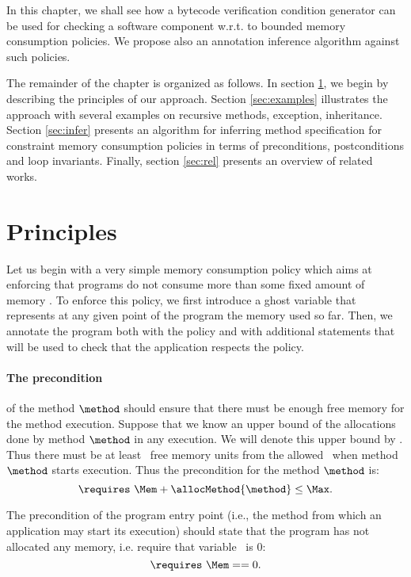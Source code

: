
In this chapter, we shall see how a bytecode verification condition generator can be used 
for checking a software component w.r.t. to bounded memory consumption policies.
We  propose also an annotation inference algorithm against such policies.

The remainder of the chapter is organized as follows. 
In section \ref{sec:principles},  we begin by describing the principles of our
approach. Section \ref{sec:examples} illustrates the approach with several examples on recursive methods, exception, inheritance.
Section \ref{sec:infer} presents an algorithm for inferring method specification for constraint memory consumption policies 
in terms of preconditions, postconditions and loop invariants. 
Finally, section \ref{sec:rel} presents an overview of related works.

\section{Principles} \label{sec:principles}
Let us begin with a very simple memory consumption policy which aims
at enforcing that  programs do not consume more than
some fixed amount of memory \Max . To enforce this policy, we first
introduce a ghost variable \Mem{} that represents at any given point of
the program the memory used so far. Then, we annotate the program both
with the policy and with additional statements that will be used to
check that the application respects the policy.



\paragraph{The precondition} of the method $\method$ should ensure that
there must be enough free memory for the method execution. Suppose
that we know an upper bound of the allocations done by method $\method$
in any execution. We will denote this upper bound by
\allocMethod{\method}. Thus there must be at least
\allocMethod{\method}\ free memory units from the allowed \Max\ when
method $\method$ starts execution. Thus the precondition for the method
$\method$ is:
$$
\requires \ \Mem + \allocMethod{\method}  \leq \Max.
$$

The precondition of the
program entry point (i.e., the method from which an application
may start its execution) should state that the program has not
allocated any memory, i.e. require that variable \Mem \ is  0:
$$
\requires \ \Mem == 0.
$$
